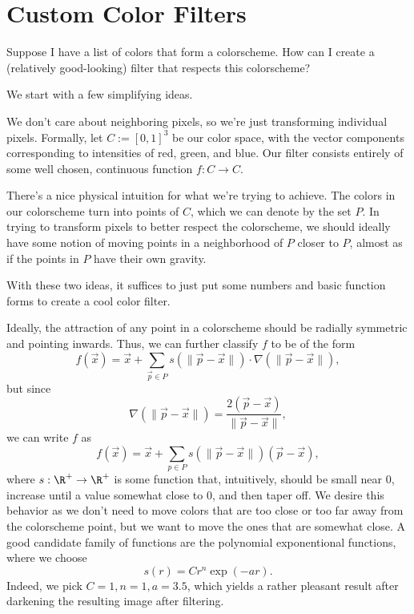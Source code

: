 \documentclass[a4paper, 12pt]{article}
\begin{document}
\section*{Custom Color Filters}

\begin{blackbox}
    \begin{problem}
        Suppose I have a list of colors that form a colorscheme. How can I
        create a (relatively good-looking) filter that respects this
        colorscheme?
    \end{problem}
\end{blackbox}

We start with a few simplifying ideas.

\begin{idea}
    We don't care about neighboring pixels, so we're just transforming
    individual pixels. Formally, let \( C := [0, 1]^3 \) be our color space,
    with the vector components corresponding to intensities of red, green, and
    blue. Our filter consists entirely of some well chosen, continuous function
    \( f : C \to C \).
\end{idea}

\begin{idea}
    There's a nice physical intuition for what we're trying to achieve. The
    colors in our colorscheme turn into points of \( C \), which we can denote
    by the set \( P \). In trying to transform pixels to better respect the
    colorscheme, we should ideally have some notion of moving points in a
    neighborhood of \( P \) closer to \( P \), almost as if the points in \( P
    \) have their own gravity.
\end{idea}

With these two ideas, it suffices to just put some numbers and basic function
forms to create a cool color filter.

Ideally, the attraction of any point in a colorscheme should be radially symmetric and pointing inwards. Thus, we can further classify \( f \) to be of the form
\[
    f(\vec{x}) = \vec{x} + \sum_{\vec{p} \in P} s(\| \vec{p} - \vec{x} \|) \cdot \nabla (\| \vec{p} - \vec{x} \|)
,\]
but since
\[
    \nabla (\| \vec{p} - \vec{x} \|) = \frac{2(\vec{p} - \vec{x})}{\| \vec{p} - \vec{x} \|}
,\]
we can write \( f \) as
\[
    f(\vec{x}) = \vec{x} +  \sum_{p \in P} s(\| \vec{p} - \vec{x} \|) (\vec{p} - \vec{x})
,\]
where \( s : \R^+ \to \R^+ \) is some function that, intuitively, should be
small near \( 0 \), increase until a value somewhat close to \( 0 \), and then
taper off. We desire this behavior as we don't need to move colors that are too
close or too far away from the colorscheme point, but we want to move the ones
that are somewhat close. A good candidate family of functions are the polynomial exponentional functions, where we choose
\[
    s(r) = C r^{n} \exp(-ar)
.\]
Indeed, we pick \( C = 1, n = 1, a = 3.5 \), which yields a rather pleasant
result after darkening the resulting image after filtering.
\end{document}
